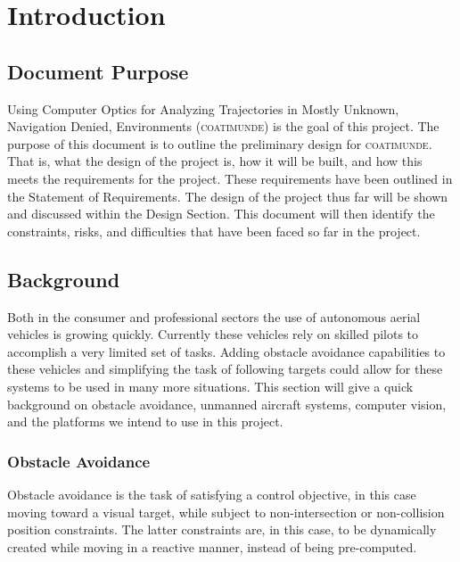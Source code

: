 \documentclass{article}
\begin{document}

\tableofcontents
\newpage

\section{Introduction}

	\subsection{Document Purpose}
	
	Using Computer Optics for Analyzing Trajectories in Mostly Unknown, Navigation Denied, Environments (\textsc{coatimunde}) is the goal of this project. The purpose of this document is to outline the preliminary design for \textsc{coatimunde}. That is, what the design of the project is, how it will be built, and how this meets the requirements for the project. These requirements have been outlined in the Statement of Requirements. The design of the project thus far will be shown and discussed within the Design Section. This document will then identify the constraints, risks, and difficulties that have been faced so far in the project.
	
	\subsection{Background}
	
	Both in the consumer and professional sectors the use of autonomous aerial vehicles is growing quickly. Currently these vehicles rely on skilled pilots to accomplish a very limited set of tasks. Adding obstacle avoidance capabilities to these vehicles and simplifying the task of following targets could allow for these systems to be used in many more situations. This section will give a quick background on obstacle avoidance, unmanned aircraft systems, computer vision, and the platforms we intend to use in this project.
	
		\subsubsection{Obstacle Avoidance}
		
		
		Obstacle avoidance is the task of satisfying a control objective, in this case moving toward a visual target, while subject to non-intersection or non-collision position constraints. The latter constraints are, in this case, to be dynamically created while moving in a reactive manner, instead of being pre-computed.
		
\end{document}
